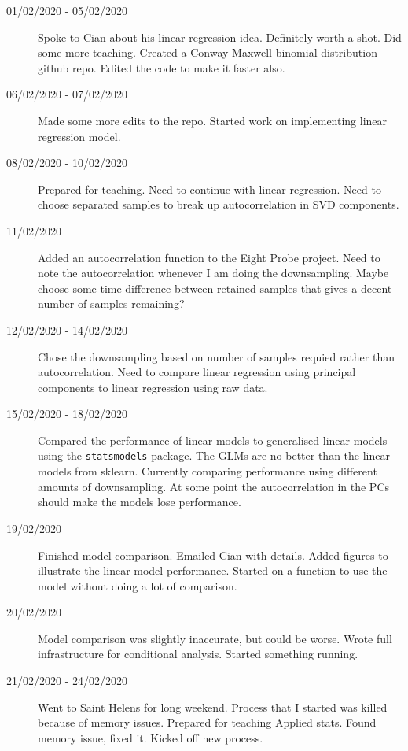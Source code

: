 \documentclass[a4paper,12pt]{article}
\theoremstyle{definition}
\begin{document}
\begin{description}
	\item[01/02/2020 - 05/02/2020] Spoke to Cian about his linear regression idea. Definitely worth a shot. Did some more teaching. Created a Conway-Maxwell-binomial distribution github repo. Edited the code to make it faster also.

	\item[06/02/2020 - 07/02/2020] Made some more edits to the repo. Started work on implementing linear regression model.

	\item[08/02/2020 - 10/02/2020] Prepared for teaching. Need to continue with linear regression. Need to choose separated samples to break up autocorrelation in SVD components.

	\item[11/02/2020] Added an autocorrelation function to the Eight Probe project. Need to note the autocorrelation whenever I am doing the downsampling. Maybe choose some time difference between retained samples that gives a decent number of samples remaining?

	\item[12/02/2020 - 14/02/2020] Chose the downsampling based on number of samples requied rather than autocorrelation. Need to compare linear regression using principal components to linear regression using raw data.

	\item[15/02/2020 - 18/02/2020] Compared the performance of linear models to generalised linear models using the \texttt{statsmodels} package. The GLMs are no better than the linear models from sklearn. Currently comparing performance using different amounts of downsampling. At some point the autocorrelation in the PCs should make the models lose performance.

	\item[19/02/2020] Finished model comparison. Emailed Cian with details. Added figures to illustrate the linear model performance. Started on a function to use the model without doing a lot of comparison.

	\item[20/02/2020] Model comparison was slightly inaccurate, but could be worse. Wrote full infrastructure for conditional analysis. Started something running.

	\item[21/02/2020 - 24/02/2020] Went to Saint Helens for long weekend. Process that I started was killed because of memory issues. Prepared for teaching Applied stats. Found memory issue, fixed it. Kicked off new process.


\end{description}
\end{document}
